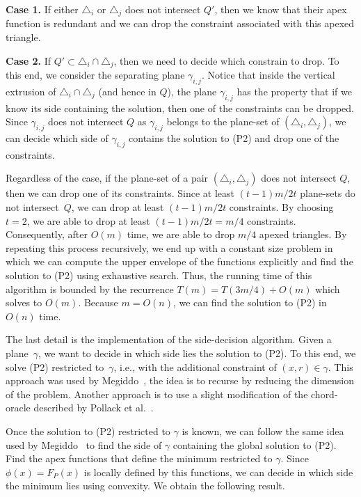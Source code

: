 \documentclass[a4paper,UKenglish]{lipics}
\newcommand{\F}[2]{\ensuremath{F_{\scriptscriptstyle #1}(#2)}}
\begin{document}
\textbf{Case 1.} If either $\triangle_i$ or $\triangle_j$ does not intersect $Q'$, then we know that their apex function is redundant and we can drop the constraint associated with this apexed triangle.

\textbf{Case 2.} If $Q'\subset \triangle_i\cap \triangle_j$, then we need to decide which constrain to drop. 
To this end, we consider the separating plane $\gamma_{i,j}$. Notice that inside the vertical extrusion of $\triangle_i\cap \triangle_j$ (and hence in $Q$), the plane $\gamma_{i,j}$ has the property that if we know its side containing the solution, then one of the constraints can be dropped. Since $\gamma_{i,j}$ does not intersect $Q$ as $\gamma_{i,j}$ belongs to the plane-set of $(\triangle_i, \triangle_j)$, we can decide which side of $\gamma_{i,j}$ contains the solution to (P2) and drop one of the constraints.
\vspace{.05in}

Regardless of the case, if the plane-set of a pair $(\triangle_i, \triangle_j)$ does not intersect $Q$, then we can drop one of its constraints. 
Since at least $(t-1)m/2t$ plane-sets do not intersect~$Q$, we can drop at least $(t-1)m/2t$ constraints.
By choosing $t = 2$, we are able to drop at least $(t-1)m/2t = m/4$ constraints.
Consequently, after $O(m)$ time, we are able to drop $m/4$ apexed triangles.
By repeating this process recursively, we end up with a constant size problem in which we can compute the upper envelope of the functions explicitly and find the solution to (P2) using exhaustive search. 
Thus, the running time of this algorithm is bounded by the recurrence $T(m) = T(3m/4) + O(m)$ which solves to $O(m)$. 
Because $m = O(n)$, we can find the solution to (P2) in $O(n)$ time.

The last detail is the implementation of the side-decision algorithm. 
Given a plane~$\gamma$, we want to decide in which side lies the solution to (P2).
To this end, we solve (P2) restricted to~$\gamma$, i.e., with the additional constraint of $(x,r)\in \gamma$. 
This approach was used by Megiddo~\cite{megiddo1989ball}, the idea is to recurse by reducing the dimension of the problem.
Another approach is to use a slight modification of the chord-oracle described by Pollack et al.~\cite[Section~3]{pollackComputingCenter}. 

Once the solution to (P2) restricted to $\gamma$ is known, we can follow the same idea used by Megiddo~\cite{megiddo1989ball} to find the side of $\gamma$ containing the global solution to (P2). 
Find the apex functions that define the minimum restricted to $\gamma$. 
Since $\phi(x) = \F{P}{x}$ is locally defined by this functions, 
we can decide in which side the minimum lies using convexity.
We obtain the following result.
\end{document}
